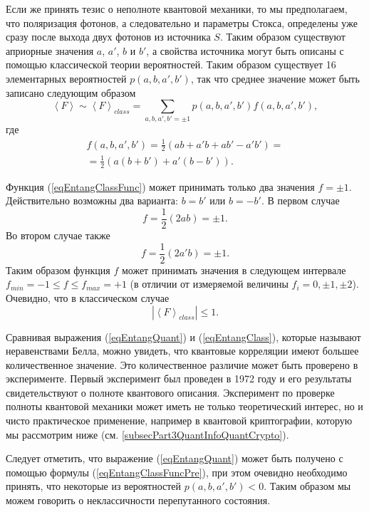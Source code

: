 Если же принять тезис о неполноте квантовой механики, то мы
предполагаем, что поляризация фотонов, а следовательно и параметры
Стокса, определены уже сразу после выхода двух фотонов из источника
$S$.  
Таким образом существуют априорные значения $a$, $a'$, $b$ и $b'$,
а свойства источника могут быть описаны с помощью
классической теории вероятностей.
Таким образом существует 16 элементарных
вероятностей $p\left(a,b,a',b'\right)$, так что среднее значение может
быть записано следующим образом
\begin{equation}
 \left<F\right> \sim \left<F\right>_{class} 
=\sum_{a,b,a',b'=\pm 1} 
p\left(a,b,a',b'\right) f\left(a,b,a',b'\right),
\label{eqEntangClassFuncPre}
\end{equation}
где 
\begin{eqnarray}
 f\left(a,b,a',b'\right) = \frac{1}{2} 
\left(
ab + a'b + ab' - a'b'
\right) = 
\nonumber \\
=
\frac{1}{2} 
\left(
a \left(b + b'\right) + a' \left(b - b'\right)
\right).
\label{eqEntangClassFunc}
\end{eqnarray}

Функция (\ref{eqEntangClassFunc}) может принимать только два значения
$f = \pm 1$. Действительно возможны два варианта: $b = b'$ или $b = - b'$. В
первом случае 
\[
f = \frac{1}{2}\left(2ab\right) = \pm 1.
\]
Во втором случае также 
\[
f = \frac{1}{2}\left(2a'b\right) = \pm 1.
\]
Таким образом функция $f$ может принимать значения в следующем
интервале $f_{min} = -1 \le f \le f_{max} = +1$ (в отличии от измеряемой величины
$f_i = 0, \pm 1, \pm 2$). Очевидно, что в классическом случае
\begin{equation}
\left|\left<F\right>_{class} \right| 
\le 1.
\label{eqEntangClass}
\end{equation}

Сравнивая выражения (\ref{eqEntangQuant}) и (\ref{eqEntangClass}),
которые называют неравенствами Белла,
можно увидеть, что квантовые корреляции имеют большее количественное
значение. Это количественное различие может быть проверено в
эксперименте. Первый эксперимент был проведен в 1972 году
\cite{PhysRevLett.28.938} и его результаты свидетельствуют о
полноте квантового описания. Эксперимент по проверке полноты квантовой
механики может иметь не только теоретический интерес, но и чисто
практическое применение, например в квантовой криптографии, которую мы
рассмотрим ниже (см. \ref{subsecPart3QuantInfoQuantCrypto}). 

Следует отметить, что выражение (\ref{eqEntangQuant}) может быть
получено с помощью формулы  (\ref{eqEntangClassFuncPre}), при этом
очевидно необходимо принять, что некоторые из вероятностей
$p\left(a,b,a',b'\right) < 0$. Таким образом мы можем говорить о
неклассичности перепутанного состояния.  
